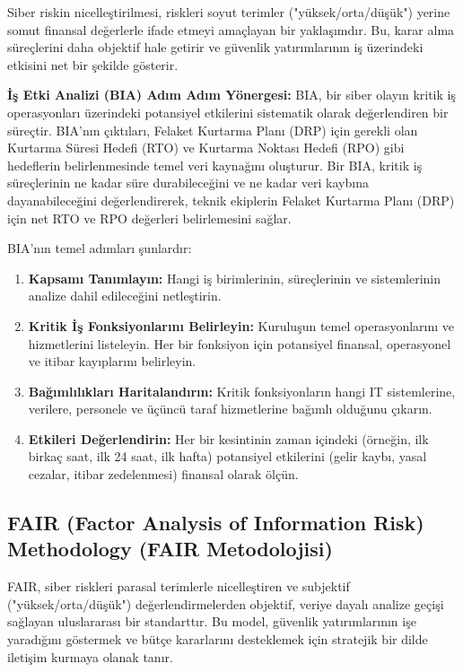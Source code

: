 Siber riskin nicelleştirilmesi, riskleri soyut terimler ("yüksek/orta/düşük") yerine somut finansal değerlerle ifade etmeyi amaçlayan bir yaklaşımdır. Bu, karar alma süreçlerini daha objektif hale getirir ve güvenlik yatırımlarının iş üzerindeki etkisini net bir şekilde gösterir.

\textbf{İş Etki Analizi (BIA) Adım Adım Yönergesi:}
BIA, bir siber olayın kritik iş operasyonları üzerindeki potansiyel etkilerini sistematik olarak değerlendiren bir süreçtir. BIA'nın çıktıları, Felaket Kurtarma Planı (DRP) için gerekli olan Kurtarma Süresi Hedefi (RTO) ve Kurtarma Noktası Hedefi (RPO) gibi hedeflerin belirlenmesinde temel veri kaynağını oluşturur. Bir BIA, kritik iş süreçlerinin ne kadar süre durabileceğini ve ne kadar veri kaybına dayanabileceğini değerlendirerek, teknik ekiplerin Felaket Kurtarma Planı (DRP) için net RTO ve RPO değerleri belirlemesini sağlar.

BIA'nın temel adımları şunlardır:
\begin{enumerate}
    \item \textbf{Kapsamı Tanımlayın:} Hangi iş birimlerinin, süreçlerinin ve sistemlerinin analize dahil edileceğini netleştirin.
    \item \textbf{Kritik İş Fonksiyonlarını Belirleyin:} Kuruluşun temel operasyonlarını ve hizmetlerini listeleyin. Her bir fonksiyon için potansiyel finansal, operasyonel ve itibar kayıplarını belirleyin.
    \item \textbf{Bağımlılıkları Haritalandırın:} Kritik fonksiyonların hangi IT sistemlerine, verilere, personele ve üçüncü taraf hizmetlerine bağımlı olduğunu çıkarın.
    \item \textbf{Etkileri Değerlendirin:} Her bir kesintinin zaman içindeki (örneğin, ilk birkaç saat, ilk 24 saat, ilk hafta) potansiyel etkilerini (gelir kaybı, yasal cezalar, itibar zedelenmesi) finansal olarak ölçün.
\end{enumerate}

\subsection{FAIR (Factor Analysis of Information Risk) Methodology (FAIR Metodolojisi)}

FAIR, siber riskleri parasal terimlerle nicelleştiren ve subjektif ("yüksek/orta/düşük") değerlendirmelerden objektif, veriye dayalı analize geçişi sağlayan uluslararası bir standarttır. Bu model, güvenlik yatırımlarının işe yaradığını göstermek ve bütçe kararlarını desteklemek için stratejik bir dilde iletişim kurmaya olanak tanır.

